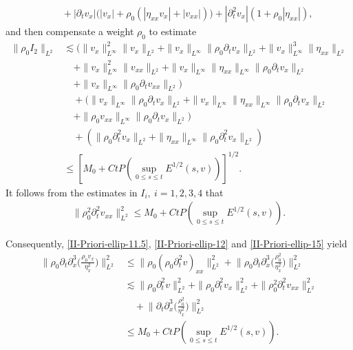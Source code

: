 \documentclass[11pt, reqno]{amsart}
\numberwithin{equation}{section}
\begin{document}
{{\begin{equation*}
\begin{aligned}
&\quad+|\partial_tv_x|\big(|v_x|+\rho_0(|\eta_{xx}v_x|+|v_{xx}|)\big)+|\partial_t^2v_x|(1+\rho_0|\eta_{xx}|),
\end{aligned}
\end{equation*}}
and then compensate a weight \(\rho_0\) to estimate
\begin{equation*}
\begin{aligned}
\|\rho_0I_2\|_{L^2}
&\lesssim (\|v_{x}\|_{L^\infty}^2\|v_{x}\|_{L^2}+\|v_{x}\|_{L^\infty}\|\rho_0\partial_tv_x\|_{L^2}
+\|v_{x}\|_{L^\infty}^3\|\eta_{xx}\|_{L^2}\\
&\quad+\|v_{x}\|_{L^\infty}^2\|v_{xx}\|_{L^2}
+\|v_{x}\|_{L^\infty}\|\eta_{xx}\|_{L^\infty}\|\rho_0\partial_tv_x\|_{L^2}\\
&\quad+\|v_{x}\|_{L^\infty}\|\rho_0\partial_tv_{xx}\|_{L^2})\\
&\quad+(\|v_{x}\|_{L^\infty}\|\rho_0\partial_tv_x\|_{L^2}
+\|v_{x}\|_{L^\infty}\|\eta_{xx}\|_{L^\infty}\|\rho_0\partial_tv_x\|_{L^2}\\
&\quad+\|\rho_0v_{xx}\|_{L^\infty}\|\rho_0\partial_tv_x\|_{L^2})\\
&\quad+(\|\rho_0\partial_t^2v_x\|_{L^2}
+\|\eta_{xx}\|_{L^\infty}\|\rho_0\partial_t^2v_x\|_{L^2})\\
&\leq  [M_0+Ct P(\sup_{0\leq s\leq t}E^{1/2}(s,v))]^{1/2}.
\end{aligned}
\end{equation*}
It follows from the estimates in \(I_i,\ i=1,2,3,4\) that
\begin{equation}\label{II-Priori-ellip-15}
\begin{aligned}
\|\rho_0^2\partial_t^2v_{xx}\|_{L^2}^2
\leq M_0+Ct P(\sup_{0\leq s\leq t}E^{1/2}(s,v)).
\end{aligned}
\end{equation}

Consequently, \eqref{II-Priori-ellip-11.5}, \eqref{II-Priori-ellip-12} and \eqref{II-Priori-ellip-15} yield
\begin{equation}\label{II-Priori-ellip-16}
\begin{aligned}
\bigg\|\rho_0\partial_t\partial_x^3\bigg(\frac{\rho_0v_x}{\eta_x^2}\bigg)\bigg\|_{L^2}^2
&\leq \|\rho_0(\rho_0\partial_t^2v)_{xx}\|_{L^2}^2
+\bigg\|\rho_0\partial_t\partial_x^3\bigg(\frac{\rho_0^2}{\eta_x^2}\bigg)\bigg\|_{L^2}^2\\
&\lesssim \|\rho_0\partial_t^2v\|_{L^2}^2+\|\rho_0\partial_t^2v_{x}\|_{L^2}^2
+\|\rho_0^2\partial_t^2v_{xx}\|_{L^2}^2\\
&\quad+\bigg\|\partial_t\partial_x^3\bigg(\frac{\rho_0^2}{\eta_x^2}\bigg)\bigg\|_{L^2}^2\\
&\leq M_0+Ct P(\sup_{0\leq s\leq t}E^{1/2}(s,v)).
\end{aligned}
\end{equation}


}
\end{document}
